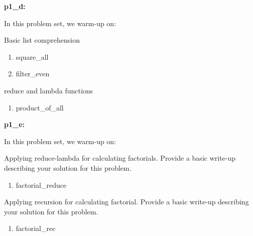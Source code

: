 \documentclass{hw}
\begin{document}
\begin{problem}
\textbf{p1\_d:}

In this problem set, we warm-up on:

\begin{subproblem}
Basic list comprehension
\begin{enumerate}
    \item square\_all
    \item filter\_even
\end{enumerate}
\end{subproblem}

\begin{subproblem}
reduce and lambda functions
\begin{enumerate}
    \item product\_of\_all
\end{enumerate}
\end{subproblem}

\end{problem}

\begin{problem}
\textbf{p1\_e:}

In this problem set, we warm-up on:

\begin{subproblem}
Applying reduce-lambda for calculating factorials. Provide a basic write-up describing your solution for this problem.
\begin{enumerate}
    \item factorial\_reduce
\end{enumerate}
\end{subproblem}

\begin{subproblem}
Applying recursion for calculating factorial. Provide a basic write-up describing your solution for this problem.
\begin{enumerate}
    \item factorial\_rec
\end{enumerate}
\end{subproblem}

\end{problem}
\end{document}
